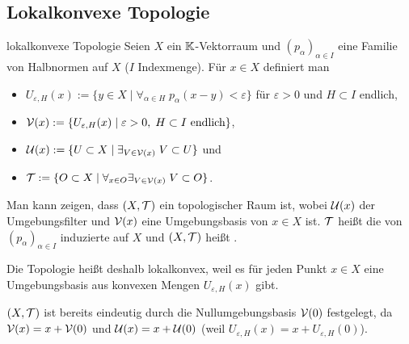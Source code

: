 \pagebreak

\subsection{%
    Lokalkonvexe Topologie%
}

\begin{Def}{lokalkonvexe Topologie}
    Seien $X$ ein $\mathbb{K}$-Vektorraum und $(p_\alpha)_{\alpha \in I}$ eine Familie von
    Halbnormen auf $X$ ($I$ Indexmenge).
    Für $x \in X$ definiert man
    \begin{itemize}
        \item
        $U_{\varepsilon,H}(x) := \{y \in X \;|\; \forall_{\alpha \in H}\;
        p_\alpha(x - y) < \varepsilon\}$
        für $\varepsilon > 0$ und $H \subset I$ endlich,

        \item
        $\mathcal{V}(x) := \{U_{\varepsilon,H}(x) \;|\; \varepsilon > 0,\; H \subset I \text{ endlich}\}$,

        \item
        $\mathcal{U}(x) := \{U \subset X \;|\; \exists_{V \in \mathcal{V}(x)}\; V \subset U\}$ und

        \item
        $\mathcal{T} := \{O \subset X \;|\; \forall_{x \in O} \exists_{V \in \mathcal{V}(x)}\; V \subset O\}$.
    \end{itemize}
    Man kann zeigen, dass $(X, \mathcal{T})$ ein topologischer Raum ist,
    wobei $\mathcal{U}(x)$ der Umgebungsfilter und $\mathcal{V}(x)$ eine Umgebungsbasis von $x \in X$ ist.
    $\mathcal{T}$ heißt die von $(p_\alpha)_{\alpha \in I}$ induzierte 
    auf $X$ und $(X, \mathcal{T})$ heißt .
\end{Def}

\begin{Bem}
    Die Topologie heißt deshalb lokalkonvex, weil es für jeden Punkt $x \in X$ eine
    Umgebungsbasis aus konvexen Mengen $U_{\varepsilon,H}(x)$ gibt.
\end{Bem}

\begin{Bem}
    $(X, \mathcal{T})$ ist bereits eindeutig durch die Nullumgebungsbasis $\mathcal{V}(0)$ festgelegt,
    da $\mathcal{V}(x) = x + \mathcal{V}(0)$ und $\mathcal{U}(x) = x + \mathcal{U}(0)$
    (weil $U_{\varepsilon,H}(x) = x + U_{\varepsilon,H}(0)$).
\end{Bem}

\linie

